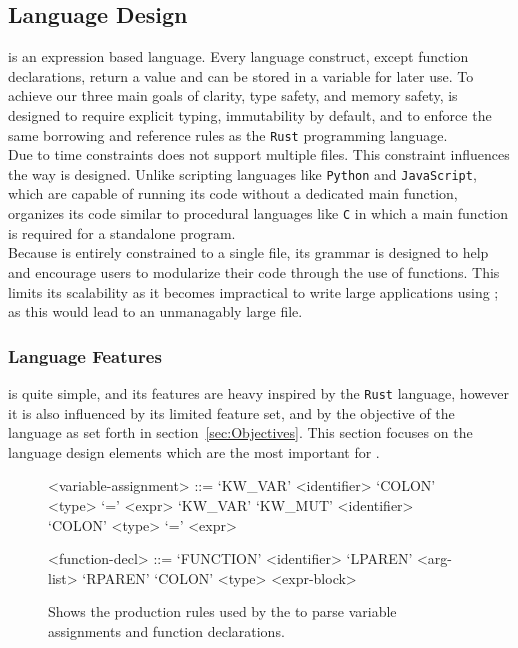\subsection{Language Design}
\label{sec:LanguageDesign}

\lang{} is an expression based language. Every language construct, except function
declarations, return a value and can be stored in a variable for later use. To achieve
our three main goals of clarity, type safety, and memory safety, \lang{} is designed
to require explicit typing, immutability by default, and to enforce the same
borrowing and reference rules as the \texttt{Rust} programming language.\\

Due to time constraints \lang{} does not support multiple files. This constraint
influences the way \lang{} is designed. Unlike scripting languages like
\texttt{Python} and \texttt{JavaScript}, which are capable of running its code without
a dedicated main function, \lang{} organizes its code similar to procedural
languages like \texttt{C} in which a main function is required for a standalone
program. \\

Because \lang{} is entirely constrained to a single file, its grammar is designed to
help and encourage users to modularize their code through the use of functions. This
limits its scalability as it becomes impractical to write large applications using
\lang{}; as this would lead to an unmanagably large file. 

\subsubsection{Language Features}
\label{sec:Grammar}

\lang{} is quite simple, and its features are heavy inspired by the
\texttt{Rust} language\cite{RUST}, however it is also influenced by its limited
feature set, and
by the objective of the language as set forth in section~\ref{sec:Objectives}. This
section focuses on the language design elements which are the most important for
\lang{}.

\begin{figure}[ht]
\centering
\begin{grammar}
<variable-assignment> ::= `KW_VAR' <identifier> `COLON' <type> `=' <expr>
\alt `KW_VAR' `KW_MUT' <identifier> `COLON' <type> `=' <expr>

<function-decl> ::= `FUNCTION' <identifier> `LPAREN' <arg-list> `RPAREN' `COLON' <type> <expr-block>
\end{grammar}
\caption{Shows the production rules used by the \parser{} to parse variable
assignments and function declarations.}
\label{fig:assignmentRule}
\end{figure}

